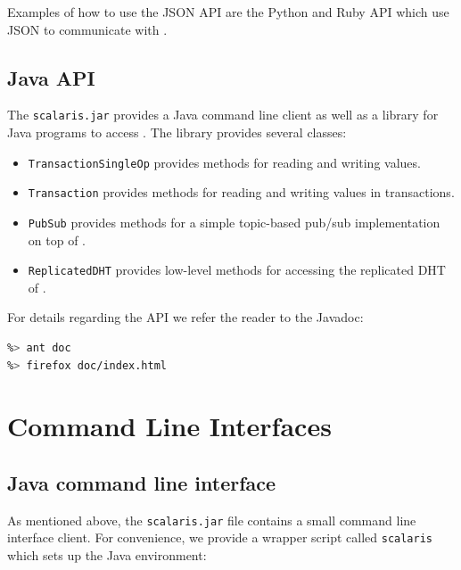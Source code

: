 \documentclass[a4paper]{scrreprt}
\newcommand{\code}[1]{\lstinline[basicstyle=\ttfamily]!#1!}
\begin{document}
Examples of how to use the JSON API are the Python and Ruby API which use JSON
to communicate with \scalaris{}.


\subsection{Java API}

The \code{scalaris.jar} provides a Java command line client as well as a
library for Java programs to access \scalaris{}. The library provides several
classes:

\begin{itemize}
\item \code{TransactionSingleOp} provides methods for reading and writing values.
\item \code{Transaction} provides methods for reading and writing values in transactions.
\item \code{PubSub} provides methods for a simple topic-based pub/sub implementation on top of \scalaris{}.
\item \code{ReplicatedDHT} provides low-level methods for accessing the replicated DHT of \scalaris{}.
\end{itemize}

For details regarding the API we refer the reader to the Javadoc:

\begin{lstlisting}[language=sh]
%> cd java-api
%> ant doc
%> firefox doc/index.html
\end{lstlisting}

\section{Command Line Interfaces}

\subsection{Java command line interface}

As mentioned above, the \code{scalaris.jar} file contains a small command line
interface client. For
convenience, we provide a wrapper script called \code{scalaris} which
sets up the Java environment:

\begin{lstlisting}[language=sh]
%> ./java-api/scalaris --noconfig --help
\end{lstlisting}

\end{document}
